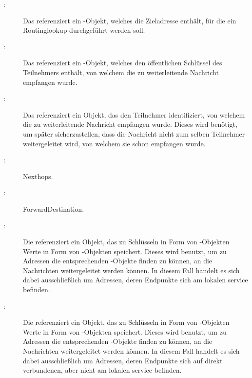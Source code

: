 \begin{description}
	
	\item [{:}]
		Das \javaarg {} referenziert ein -Objekt,
		welches die Zieladresse enthält, für die ein Routinglookup durchgeführt werden soll.
	
	\item [{:}]
		Das \javaarg {} referenziert ein -Objekt, welches
		den öffentlichen Schlüssel des Teilnehmers enthält, von welchem die zu weiterleitende
		Nachricht empfangen wurde.
	
	\item [{:}]
		Das \javaarg {} referenziert ein Objekt, das den Teilnehmer
		identifiziert, von welchem die zu weiterleitende Nachricht empfangen wurde. Dieses wird
		benötigt, um später sicherzustellen, dass die Nachricht nicht zum selben Teilnehmer
		weitergeleitet wird, von welchem sie schon empfangen wurde.
	
	\item [{:}]
		\glsdesc{Nexthops}.
	
	\item [{:}]
		\glsdesc{ForwardDestination}.
	
	\item [{:}]
		Die \javainstvar {} referenziert ein Objekt, das zu Schlüsseln
		in Form von -Objekten Werte in Form von -Objekten
		speichert. Dieses wird benutzt, um zu Adressen die entsprechenden
		-Objekte finden zu können, an die Nachrichten weitergeleitet werden
		können. In diesem Fall handelt es sich dabei ausschließlich um Adressen, deren Endpunkte
		sich am lokalen \gls{service} befinden.
	
	\item [{:}]
		Die \javainstvar {} referenziert ein Objekt, das zu Schlüsseln
		in Form von -Objekten Werte in Form von -Objekten
		speichert. Dieses wird benutzt, um zu Adressen die entsprechenden
		-Objekte finden zu können, an die Nachrichten weitergeleitet werden
		können. In diesem Fall handelt es sich dabei ausschließlich um Adressen, deren Endpunkte
		sich auf direkt verbundenen, aber nicht am lokalen \gls{service} befinden.
	
\end{description}

